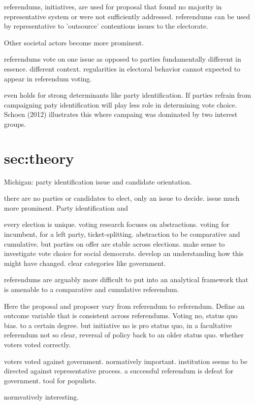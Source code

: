 \documentclass[11pt,a4paper]{article}
\begin{document}
referendums, initiatives, are used for proposal that found no majority in representative system or were not sufficiently addressed. referendums can be used by representative to 'outsource' contentious issues to the electorate. 

Other societal actors become more prominent. 

referendums vote on one issue as opposed to parties fundamentally different in essence. different context. regularities in electoral behavior cannot expected to appear in referendum voting.

even holds for strong determinants like party identification. If parties refrain from campaigning paty identification will play less role in determining vote choice. Schoen (2012) illustrates this where campaing was dominated by two interest groups.

\section{sec:theory}

Michigan: party identification issue and candidate orientation. 

there are no parties or candidates to elect, only an issue to decide. issue much more prominent. Party identification and 

every election is unique. voting research focuses on abstractions. voting for incumbent, for a left party, ticket-splitting. abstraction to be comparative and cumulative. but parties on offer are stable across elections. make sense to investigate vote choice for social democrats. develop an understanding how this might have changed. clear categories like government.

referendums are arguably more difficult to put into an analytical framework that is amenable to a comparative and cumulative referendum.

Here the proposal and proposer vary from referendum to referendum. 
Define an outcome variable that is consistent across referendums. Voting no, status quo bias. to a certain degree. but initiative no is pro status quo, in a facultative referendum not so clear, reversal of policy back to an older status quo. whether voters voted correctly. 

voters voted against government. normatively important. institution seems to be directed against representative process. a successful referendum is defeat for government. tool for populists.

normvatively interesting.
\end{document}
